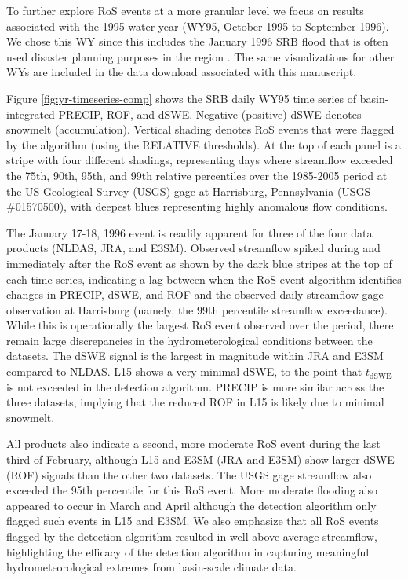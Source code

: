 \documentclass[nhess, manuscript]{copernicus}
\begin{document}
To further explore RoS events at a more granular level we focus on results associated with the 1995 water year (WY95, October 1995 to September 1996).
We chose this WY since this includes the January 1996 SRB flood that is often used disaster planning purposes in the region \citep{army2001non}.
The same visualizations for other WYs are included in the data download associated with this manuscript.

Figure \ref{fig:yr-timeseries-comp} shows the SRB daily WY95 time series of basin-integrated PRECIP, ROF, and dSWE.
Negative (positive) dSWE denotes snowmelt (accumulation).
Vertical shading denotes RoS events that were flagged by the algorithm (using the RELATIVE thresholds).
At the top of each panel is a stripe with four different shadings, representing days where streamflow exceeded the 75th, 90th, 95th, and 99th relative percentiles over the 1985-2005 period at the US Geological Survey (USGS) gage at Harrisburg, Pennsylvania (USGS \#01570500), with deepest blues representing highly anomalous flow conditions.

The January 17-18, 1996 event is readily apparent for three of the four data products (NLDAS, JRA, and E3SM).
Observed streamflow spiked during and immediately after the RoS event as shown by the dark blue stripes at the top of each time series, indicating a lag between when the RoS event algorithm identifies changes in PRECIP, dSWE, and ROF and the observed daily streamflow gage observation at Harrisburg (namely, the 99th percentile streamflow exceedance).
While this is operationally the largest RoS event observed over the period, there remain large discrepancies in the hydrometerological conditions between the datasets.
The dSWE signal is the largest in magnitude within JRA and E3SM compared to NLDAS.
L15 shows a very minimal dSWE, to the point that $t_\textrm{dSWE}$ is not exceeded in the detection algorithm.
PRECIP is more similar across the three datasets, implying that the reduced ROF in L15 is likely due to minimal snowmelt.

All products also indicate a second, more moderate RoS event during the last third of February, although L15 and E3SM (JRA and E3SM) show larger dSWE (ROF) signals than the other two datasets.
The USGS gage streamflow also exceeded the 95th percentile for this RoS event.
More moderate flooding also appeared to occur in March and April although the detection algorithm only flagged such events in L15 and E3SM.
We also emphasize that all RoS events flagged by the detection algorithm resulted in well-above-average streamflow, highlighting the efficacy of the detection algorithm in capturing meaningful hydrometeorological extremes from basin-scale climate data.
\end{document}
